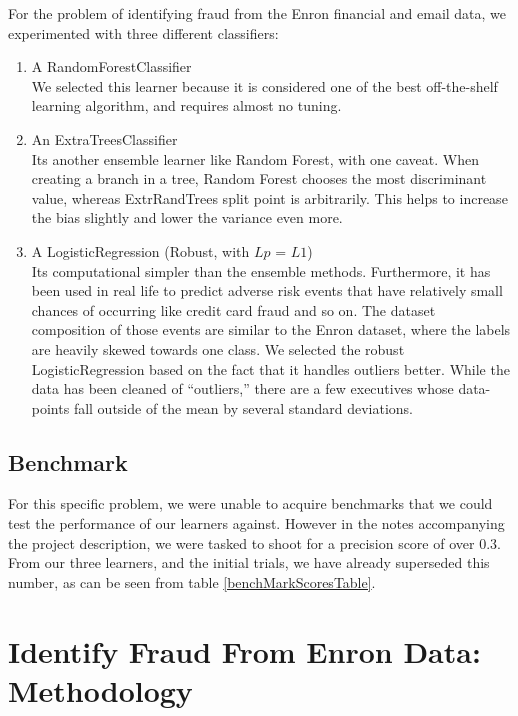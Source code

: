 \documentclass[twoside,openright,titlepage,numbers=noenddot,headinclude,%
               footinclude=true,cleardoublepage=empty,abstractoff,BCOR=5mm,%
               paper=a4,fontsize=11pt,ngerman,american]{scrreprt}
\numberwithin{theorem}{chapter}
\numberwithin{definition}{chapter}
\numberwithin{algorithm}{chapter}
\numberwithin{figure}{chapter}
\numberwithin{table}{chapter}
\numberwithin{equation}{chapter}
\begin{document}
For the problem of identifying fraud from the Enron financial and email data, we experimented with three different classifiers:
\begin{enumerate}%
\item A RandomForestClassifier\\
We selected this learner because it is considered one of the best off-the-shelf learning algorithm, and requires almost no tuning. 
\item An ExtraTreesClassifier\\
 Its another ensemble learner like Random Forest, with one caveat. When creating a branch in a tree, Random Forest chooses the most discriminant value, whereas ExtrRandTrees split point is arbitrarily. This helps to increase the bias slightly and lower the variance even more.
\item A LogisticRegression (Robust, with $Lp$ = $L1$) \\
Its computational simpler than the ensemble methods. Furthermore, it has been used in real life to predict adverse risk events that have relatively small chances of occurring like credit card fraud and so on. The dataset composition of those events are similar to the Enron dataset, where the labels are heavily skewed towards one class.
We selected the robust LogisticRegression based on the fact that it handles outliers better. While the data has been cleaned of ``outliers,'' there are a few executives whose data-points fall outside of the mean by several standard deviations.
\end{enumerate}



\section*{Benchmark}

For this specific problem, we were unable to acquire benchmarks that we could test the performance of our learners against. However in the notes accompanying the project description, we were tasked to shoot for a precision score of over 0.3. From our three learners, and the initial trials, we have already superseded this number, as can be seen from table \ref{benchMarkScoresTable}.


\chapter*{Identify Fraud From Enron Data: Methodology}
\end{document}
